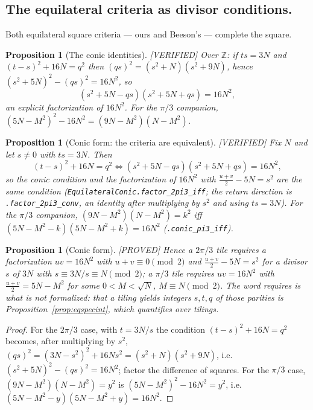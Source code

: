 \documentclass[11pt,reqno]{amsart}
\theoremstyle{plain}
\newtheorem{proposition}[theorem]{Proposition}
\theoremstyle{definition}
\newcommand{\Z}{\mathbb{Z}}
\newcommand{\lab}[1]{\hfill\textnormal{\footnotesize\textsc{[#1]}}}
\begin{document}
\subsection*{The equilateral criteria as divisor conditions.}
Both equilateral square criteria --- ours and Beeson's --- complete the square.

\begin{proposition}[The conic identities]\label{prop:conic}\lab{VERIFIED}
Over $\Z$: if $ts=3N$ and $(t-s)^2+16N=q^2$ then $(qs)^2=(s^2+N)(s^2+9N)$, hence
$(s^2+5N)^2-(qs)^2=16N^2$, so
\[
(s^2+5N-qs)(s^2+5N+qs)=16N^2 ,
\]
an explicit factorization of $16N^2$. For the $\pi/3$ companion,
$(5N-M^2)^2-16N^2=(9N-M^2)(N-M^2)$.
\end{proposition}

\begin{proposition}[Conic form: the criteria are equivalent]\label{prop:conicequiv}\lab{VERIFIED}
Fix $N$ and let $s\neq0$ with $ts=3N$. Then
\[
(t-s)^2+16N=q^2 \iff (s^2+5N-qs)(s^2+5N+qs)=16N^2 ,
\]
so the conic condition and the factorization of $16N^2$ with $\tfrac{u+v}2-5N=s^2$ are the same
condition (\texttt{EquilateralConic.factor\_2pi3\_iff}; the return direction is
\texttt{.factor\_2pi3\_conv}, an identity after multiplying by $s^2$ and using $ts=3N$).
For the $\pi/3$ companion, $(9N-M^2)(N-M^2)=k^2$ iff $(5N-M^2-k)(5N-M^2+k)=16N^2$
(\texttt{.conic\_pi3\_iff}).
\end{proposition}

\begin{proposition}[Conic form]\label{prop:conicform}\lab{PROVED}
Hence a $2\pi/3$ tile requires a factorization $uv=16N^2$ with $u+v\equiv0\pmod2$ and
$\tfrac{u+v}2-5N=s^2$ for a divisor $s$ of $3N$ with $s\equiv 3N/s\equiv N\pmod2$; a $\pi/3$ tile
requires $uv=16N^2$ with $\tfrac{u+v}2 = 5N-M^2$ for some $0<M<\sqrt N$, $M\equiv N\pmod 2$. The
word \emph{requires} is what is not formalized: that a tiling yields integers $s,t,q$ of those
parities is Proposition~\ref{prop:eqspecint}, which quantifies over tilings.
\end{proposition}

\begin{proof}
For the $2\pi/3$ case, with $t=3N/s$ the condition $(t-s)^2+16N=q^2$ becomes, after multiplying
by $s^2$, $(qs)^2=(3N-s^2)^2+16Ns^2=(s^2+N)(s^2+9N)$, i.e.\
$(s^2+5N)^2-(qs)^2=16N^2$; factor the difference of squares. For the $\pi/3$ case,
$(9N-M^2)(N-M^2)=y^2$ is $(5N-M^2)^2-16N^2=y^2$, i.e.\ $(5N-M^2-y)(5N-M^2+y)=16N^2$.
\end{proof}
\end{document}
